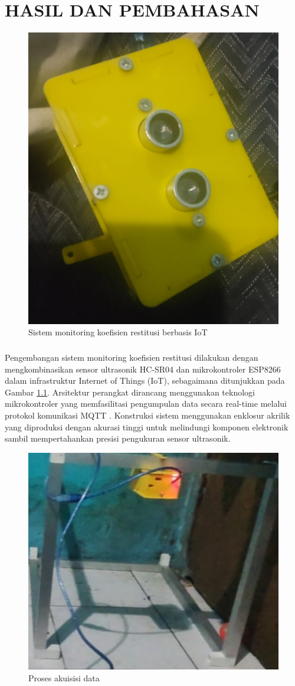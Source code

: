 \chapter{HASIL DAN PEMBAHASAN}

\begin{figure}[!htbp]
    \centering
    \includegraphics[width=0.5\linewidth]{images/alat yang sudah selesai.jpg}
    \caption{Sistem monitoring koefisien restitusi berbasis IoT}
    \label{fig:pembahasan-1}
\end{figure}

\paragraph{}Pengembangan sistem monitoring koefisien restitusi dilakukan dengan mengkombinasikan sensor ultrasonik HC-SR04 dan mikrokontroler ESP8266 dalam infrastruktur Internet of Things (IoT), sebagaimana ditunjukkan pada Gambar \ref{fig:pembahasan-1}. Arsitektur perangkat dirancang menggunakan teknologi mikrokontroler yang memfasilitasi pengumpulan data secara real-time melalui protokol komunikasi MQTT \citep{kim2020mqtt}. Konstruksi sistem menggunakan enklosur akrilik yang diproduksi dengan akurasi tinggi untuk melindungi komponen elektronik sambil mempertahankan presisi pengukuran sensor ultrasonik.

\begin{figure}[!htbp]
    \centering
    \includegraphics[width=0.5\linewidth]{images/akuisisi-data.jpeg}
    \caption{Proses akuisisi data}
    \label{fig:pembahasan-2}
\end{figure}

